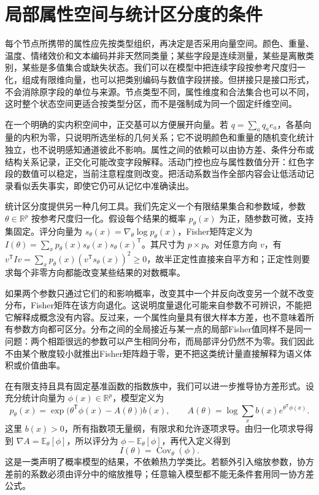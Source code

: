 \section{局部属性空间与统计区分度的条件}
\label{sec:section_7949}

每个节点所携带的属性应先按类型组织，再决定是否采用向量空间。颜色、重量、温度、情绪效价和文本编码并非天然同类量；某些字段是连续测量，某些是离散类别，某些是多值集合或缺失状态。我们可以在模型中把连续字段按参考尺度归一化，组成有限维向量，也可以把类别编码与数值字段拼接。但拼接只是接口形式，不会消除原字段的单位与来源。节点类型不同，属性维度和合法集合也可以不同，这时整个状态空间更适合按类型分区，而不是强制成为同一个固定纤维空间。

在一个明确的实内积空间中，正交基可以方便展开向量。若 $q=\sum_a q_a e_a$，各基向量的内积为零，只说明所选坐标的几何关系；它不说明颜色和重量的随机变化统计独立，也不说明感知通道彼此不影响。属性之间的依赖可以由协方差、条件分布或结构关系记录，正交化可能改变字段解释。活动门控也应与属性数值分开：红色字段的数值可以稳定，当前注意程度则改变。把活动系数当作全部内容会让低活动记录看似丢失事实，即使它仍可从记忆中准确读出。

统计区分度提供另一种几何工具。我们先定义一个有限结果集合和参数域，参数 $\theta\in\mathbb R^p$ 按参考尺度归一化。假设每个结果的概率 $p_\theta(x)$ 为正，随参数可微，支持集固定。评分向量为 $s_\theta(x)=\nabla_\theta\log p_\theta(x)$，Fisher矩阵定义为 $I(\theta)=\sum_xp_\theta(x)s_\theta(x)s_\theta(x)^{\mathsf T}$。其尺寸为 $p\times p$。对任意方向 $v$，有 $v^{\mathsf T}Iv=\sum_xp_\theta(x)(v^{\mathsf T}s_\theta(x))^2\geq0$，故半正定性直接来自平方和；正定性则要求每个非零方向都能改变某些结果的对数概率。

如果两个参数只通过它们的和影响概率，改变其中一个并反向改变另一个就不改变分布，Fisher矩阵在该方向退化。这说明度量退化可能来自参数不可辨识，不能把它解释成概念没有内容。反过来，一个属性向量具有很大样本方差，也不意味着所有参数方向都可区分。分布之间的全局接近与某一点的局部Fisher值同样不是同一问题：两个相距很远的参数可以产生相同分布，而局部评分仍然不为零。我们因此不由某个散度较小就推出Fisher矩阵趋于零，更不把这类统计量直接解释为语义体积或价值曲率。

在有限支持且具有固定基准函数的指数族中，我们可以进一步推导协方差形式。设充分统计向量为 $\phi(x)\in\mathbb R^p$，模型定义为
\[
 p_\theta(x)=\exp\bigl(\theta^{\mathsf T}\phi(x)-A(\theta)\bigr)b(x),\qquad
 A(\theta)=\log\sum_x b(x)e^{\theta^{\mathsf T}\phi(x)}.
\]
这里 $b(x)>0$，所有指数项无量纲，有限求和允许逐项求导。由归一化项求导得到 $\nabla A=\mathbb E_\theta[\phi]$，所以评分为 $\phi-\mathbb E_\theta[\phi]$，再代入定义得到
\[
 I(\theta)=\operatorname{Cov}_\theta(\phi).
\]
这是一类声明了概率模型的结果，不依赖热力学类比。若额外引入缩放参数，协方差前的系数必须由评分中的缩放推导；任意输入模型都不能无条件套用同一协方差公式。

